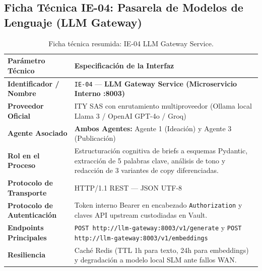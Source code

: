 \documentclass[11pt,a4paper]{article}
\begin{document}
\subsection{Ficha Técnica IE-04: Pasarela de Modelos de Lenguaje (LLM Gateway)}\label{sec:ie04}
\begin{table}[h!]
\centering
\small
\begin{tabular}{p{4.5cm} p{11cm}}
\toprule
\textbf{Parámetro Técnico} & \textbf{Especificación de la Interfaz} \\
\midrule
\textbf{Identificador / Nombre} & \texttt{IE-04} --- \textbf{LLM Gateway Service (Microservicio Interno :8003)} \\
\textbf{Proveedor Oficial} & ITY SAS con enrutamiento multiproveedor (Ollama local Llama 3 / OpenAI GPT-4o / Groq) \\
\textbf{Agente Asociado} & \textbf{Ambos Agentes:} Agente 1 (Ideación) y Agente 3 (Publicación) \\
\textbf{Rol en el Proceso} & Estructuración cognitiva de briefs a esquemas Pydantic, extracción de 5 palabras clave, análisis de tono y redacción de 3 variantes de copy diferenciadas. \\
\textbf{Protocolo de Transporte} & HTTP/1.1 REST --- JSON UTF-8 \\
\textbf{Protocolo de Autenticación} & Token interno Bearer en encabezado \texttt{Authorization} y claves API upstream custodiadas en Vault. \\
\textbf{Endpoints Principales} & \texttt{POST http://llm-gateway:8003/v1/generate} y \texttt{POST http://llm-gateway:8003/v1/embeddings} \\
\textbf{Resiliencia} & Caché Redis (TTL 1h para texto, 24h para embeddings) y degradación a modelo local SLM ante fallos WAN. \\
\bottomrule
\end{tabular}
\caption{Ficha técnica resumida: IE-04 LLM Gateway Service.}
\end{table}
\end{document}

